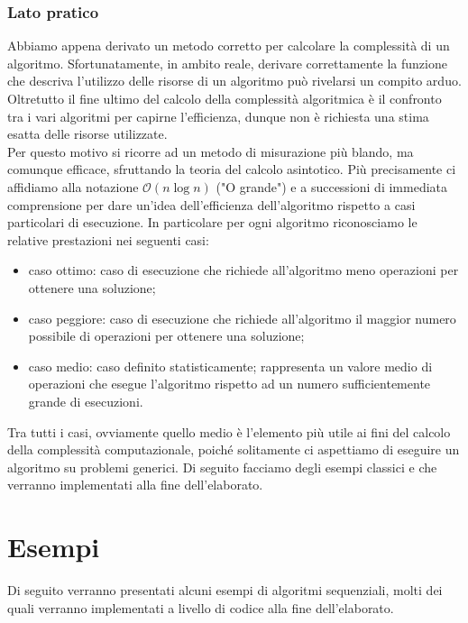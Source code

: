 \subsection{Lato pratico}
Abbiamo appena derivato un metodo corretto per calcolare la complessità di un algoritmo. Sfortunatamente, in ambito reale, derivare correttamente la funzione che descriva l'utilizzo delle risorse di un algoritmo può rivelarsi un compito arduo. Oltretutto il fine ultimo del calcolo della complessità algoritmica è il confronto tra i vari algoritmi per capirne l'efficienza, dunque non è richiesta una stima esatta delle risorse utilizzate.\\
Per questo motivo si ricorre ad un metodo di misurazione più blando, ma comunque efficace, sfruttando la teoria del calcolo asintotico. Più precisamente ci affidiamo alla notazione $\mathcal{O}(n \log {}n)$ ("O grande") e a successioni di immediata comprensione per dare un'idea dell'efficienza dell'algoritmo rispetto a casi particolari di esecuzione. In particolare per ogni algoritmo riconosciamo le relative prestazioni nei seguenti casi:
\begin{itemize}
\item{caso ottimo: caso di esecuzione che richiede all'algoritmo meno operazioni per ottenere una soluzione;}
\item{caso peggiore: caso di esecuzione che richiede all'algoritmo il maggior numero possibile di operazioni per ottenere una soluzione;}
\item{caso medio: caso definito statisticamente; rappresenta un valore medio di operazioni che esegue l'algoritmo rispetto ad un numero sufficientemente grande di esecuzioni.}
\end{itemize}
Tra tutti i casi, ovviamente quello medio è l'elemento più utile ai fini del calcolo della complessità computazionale, poiché solitamente ci aspettiamo di eseguire un algoritmo su problemi generici.
Di seguito facciamo degli esempi classici e che verranno implementati alla fine dell'elaborato.
\chapter{Esempi}
Di seguito verranno presentati alcuni esempi di algoritmi sequenziali, molti dei quali verranno implementati a livello di codice alla fine dell'elaborato.
